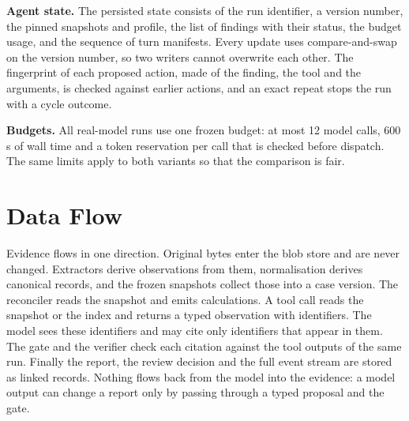 \textbf{Agent state.} The persisted state consists of the run identifier, a version number, the pinned
snapshots and profile, the list of findings with their status, the budget usage, and the sequence of turn
manifests. Every update uses compare-and-swap on the version number, so two writers cannot overwrite each
other. The fingerprint of each proposed action, made of the finding, the tool and the arguments, is checked
against earlier actions, and an exact repeat stops the run with a cycle outcome.

\textbf{Budgets.} All real-model runs use one frozen budget: at most 12 model calls, 600\,s of wall time
and a token reservation per call that is checked before dispatch. The same limits apply to both variants so
that the comparison is fair.

\section{Data Flow}
\label{sec:dataflow}
Evidence flows in one direction. Original bytes enter the blob store and are never changed. Extractors derive
observations from them, normalisation derives canonical records, and the frozen snapshots collect those into
a case version. The reconciler reads the snapshot and emits calculations. A tool call reads the snapshot or the
index and returns a typed observation with identifiers. The model sees these identifiers and may cite only
identifiers that appear in them. The gate and the verifier check each citation against the tool outputs of the
same run. Finally the report, the review decision and the full event stream are stored as linked records.
Nothing flows back from the model into the evidence: a model output can change a report only by passing
through a typed proposal and the gate.
